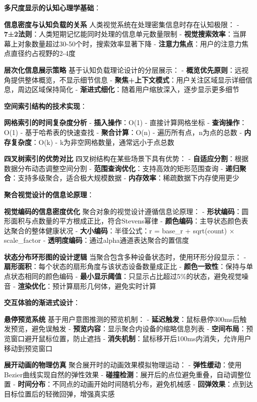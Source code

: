 \textbf{多尺度显示的认知心理学基础}：

\textbf{信息密度与认知负载的关系} 人类视觉系统在处理密集信息时存在认知极限： - \textbf{7±2法则}：人类短期记忆能同时处理的信息单元数量限制 - \textbf{视觉搜索效率}：当屏幕上对象数量超过30-50个时，搜索效率显著下降 - \textbf{注意力焦点}：用户的注意力焦点直径约占视野的2-4度

\textbf{层次化信息展示策略} 基于认知负载理论设计的分层展示： - \textbf{概览优先原则}：远视角提供整体概览，不显示细节信息 - \textbf{聚焦+上下文模式}：用户关注区域显示详细信息，周边区域保持简化 - \textbf{渐进式细化}：随着用户缩放深入，逐步显示更多细节

\textbf{空间索引结构的技术实现}：

\textbf{网格索引的时间复杂度分析} - \textbf{插入操作}：O(1) - 直接计算网格坐标 - \textbf{查询操作}：O(1) - 基于哈希表的快速查找 - \textbf{聚合计算}：O(n) - 遍历所有点，n为点的总数 - \textbf{内存复杂度}：O(k) - k为非空网格数量，通常远小于点总数

\textbf{四叉树索引的优势对比} 四叉树结构在某些场景下具有优势： - \textbf{自适应分割}：根据数据分布动态调整空间分割 - \textbf{范围查询优化}：支持高效的矩形范围查询 - \textbf{递归聚合}：支持多级聚合，适合极大规模数据 - \textbf{内存效率}：稀疏数据下内存使用更少

\textbf{聚合视觉设计的信息论原理}：

\textbf{视觉编码的信息密度优化} 聚合对象的视觉设计遵循信息论原理： - \textbf{形状编码}：圆形面积与点数量的平方根成正比，符合Stevens幂律 - \textbf{颜色编码}：主导状态颜色表达聚合的整体健康状况 - \textbf{大小编码}：半径公式：r = base\_r + sqrt(count) × scale\_factor - \textbf{透明度编码}：通过alpha通道表达聚合的置信度

\textbf{状态分布环形图的设计逻辑} 当聚合包含多种设备状态时，使用环形分段显示： - \textbf{扇形面积}：每个状态的扇形角度与该状态设备数量成正比 - \textbf{颜色一致性}：保持与单点状态相同的颜色编码 - \textbf{最小显示阈值}：只显示占比超过5\%的状态，避免视觉噪音 - \textbf{渲染优化}：预计算扇形几何体，避免实时计算

\textbf{交互体验的渐进式设计}：

\textbf{悬停预览系统} 基于用户意图推测的预览机制： - \textbf{延迟触发}：鼠标悬停300ms后触发预览，避免误触发 - \textbf{预览内容}：显示聚合内设备的缩略信息列表 - \textbf{空间布局}：预览窗口避开鼠标位置，防止遮挡 - \textbf{消失机制}：鼠标移开后100ms内消失，允许用户移动到预览窗口

\textbf{展开动画的物理仿真} 聚合展开时的动画效果模拟物理运动： - \textbf{弹性缓动}：使用Bezier曲线实现自然的弹性效果 - \textbf{碰撞检测}：展开后的点位避免重叠，自动调整位置 - \textbf{时间分布}：不同点的动画开始时间随机分布，避免机械感 - \textbf{回弹效果}：点到达目标位置后的轻微回弹，增强真实感


